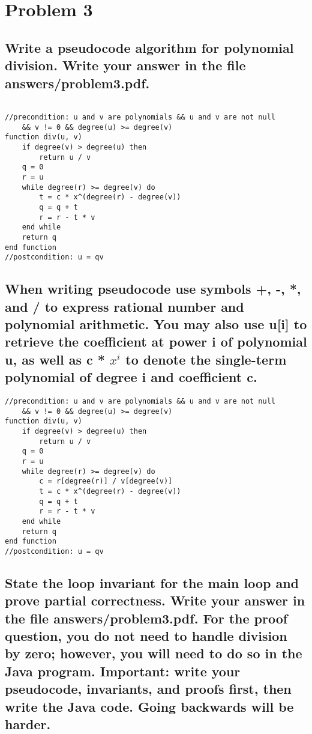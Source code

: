 \documentclass[11pt]{article}
\begin{document}
\section{Problem 3}

\subsection{Write a pseudocode algorithm for polynomial division. Write your answer in the file
answers/problem3.pdf.}
\begin{verbatim}

//precondition: u and v are polynomials && u and v are not null
    && v != 0 && degree(u) >= degree(v)
function div(u, v)
    if degree(v) > degree(u) then
        return u / v
    q = 0
    r = u
    while degree(r) >= degree(v) do
        t = c * x^(degree(r) - degree(v))
        q = q + t
        r = r - t * v
    end while
    return q
end function
//postcondition: u = qv

\end{verbatim}

\subsection{When writing pseudocode use symbols +, -, *, and / to express rational
number and polynomial arithmetic. You may also use u[i] to retrieve the
coefficient at power i of polynomial u, as well as c * $x^{i}$
to denote the single-term polynomial of degree i and coefficient c.}
\begin{verbatim}
//precondition: u and v are polynomials && u and v are not null
    && v != 0 && degree(u) >= degree(v)
function div(u, v)
    if degree(v) > degree(u) then
        return u / v
    q = 0
    r = u
    while degree(r) >= degree(v) do
        c = r[degree(r)] / v[degree(v)]
        t = c * x^(degree(r) - degree(v))
        q = q + t
        r = r - t * v
    end while
    return q
end function
//postcondition: u = qv
\end{verbatim}

\subsection{State the loop invariant for the main loop and prove partial correctness. Write your answer in
the file answers/problem3.pdf. For the proof question, you do not need to handle division
by zero; however, you will need to do so in the Java program.
Important: write your pseudocode, invariants, and proofs first, then write the Java code.
Going backwards will be harder.}
\end{document}
